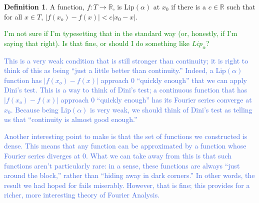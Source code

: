 \documentclass{amsart}
\newcommand{\al}{\alpha} %
\newcommand{\R}{\mathbb{R}}
\newcommand{\colorcomment}[2]{\textcolor{#1}{#2}} %
\newcommand{\absval}[1]{\left| #1 \right|}
\theoremstyle{definition}
\newtheorem{definition}[thm]{Definition}
\begin{document}
\begin{definition}
A function, $f: T \to \R$, is Lip$(\alpha)$ at $x_0$ if there is a $c \in \R$ such that for all $x \in T$, $\absval{f(x_o) - f(x)} < c\absval{x_0-x}$. 
\end{definition}

\colorcomment{Green}{I'm not sure if I'm typesetting that in the standard way (or, honestly, if I'm saying that right). Is that fine, or should I do something like $Lip_\al$?}

\colorcomment{RoyalBlue}{This is a very weak condition that is still stronger than continuity; it is right to think of this as being ``just a little better than continuity.''
Indeed, a Lip$(\alpha)$ function has $\absval{f(x_o) - f(x)}$ approach $0$ ``quickly enough'' that we can apply Dini's test.
This is a way to think of Dini's test; a continuous function that has $\absval{f(x_o) - f(x)}$ approach $0$ ``quickly enough'' has its Fourier series converge at $x_0$. 
Because being Lip$(\alpha)$ is very weak, we should think of Dini's test as telling us that ``continuity is almost good enough.''
}

\colorcomment{RoyalBlue}{Another interesting point to make is that the set of functions we constructed is dense. 
This means that any function can be approximated by a function whose Fourier series diverges at $0$. 
What we can take away from this is that such functions aren't particularly rare: in a sense, these functions are always ``just around the block,'' rather than ``hiding away in dark corners.''
In other words, the result we had hoped for fails miserably. 
However, that is fine; this provides for a richer, more interesting theory of Fourier Analysis.}
\end{document}
